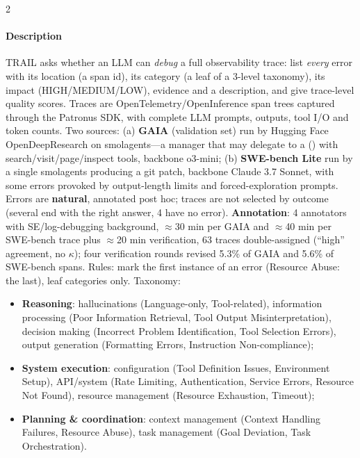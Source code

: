 \begin{multicols}{2}
\paragraph{Description} TRAIL asks whether an LLM can \emph{debug} a full observability trace: list \emph{every} error with its location (a span id), its category (a leaf of a 3-level taxonomy), its impact (HIGH/MEDIUM/LOW), evidence and a description, and give trace-level quality scores. Traces are OpenTelemetry/OpenInference span trees captured through the Patronus SDK, with complete LLM prompts, outputs, tool I/O and token counts. Two sources: (a) \textbf{GAIA} (validation set) run by Hugging Face OpenDeepResearch on smolagents---a manager  that may delegate to a  () with search/visit/page/inspect tools, backbone o3-mini; (b) \textbf{SWE-bench Lite} run by a single smolagents  producing a git patch, backbone Claude 3.7 Sonnet, with some errors provoked by output-length limits and forced-exploration prompts. Errors are \textbf{natural}, annotated post hoc; traces are not selected by outcome (several end with the right answer, 4 have no error). \textbf{Annotation}: 4 annotators with SE/log-debugging background, $\approx$30 min per GAIA and $\approx$40 min per SWE-bench trace plus $\approx$20 min verification, 63 traces double-assigned (``high'' agreement, no $\kappa$); four verification rounds revised 5.3\% of GAIA and 5.6\% of SWE-bench spans. Rules: mark the first instance of an error (Resource Abuse: the last), leaf categories only. Taxonomy:
\begin{itemize}
\item \textbf{Reasoning}: hallucinations (Language-only, Tool-related), information processing (Poor Information Retrieval, Tool Output Misinterpretation), decision making (Incorrect Problem Identification, Tool Selection Errors), output generation (Formatting Errors, Instruction Non-compliance);
\item \textbf{System execution}: configuration (Tool Definition Issues, Environment Setup), API/system (Rate Limiting, Authentication, Service Errors, Resource Not Found), resource management (Resource Exhaustion, Timeout);
\item \textbf{Planning \& coordination}: context management (Context Handling Failures, Resource Abuse), task management (Goal Deviation, Task Orchestration).
\end{itemize}


\end{multicols}
